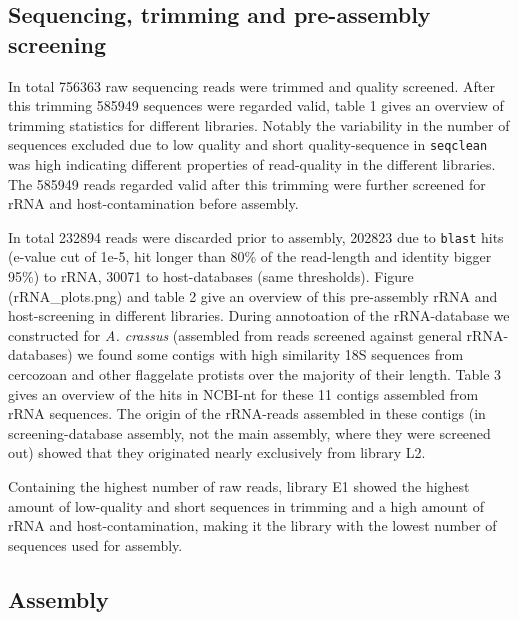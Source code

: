 \documentclass[10pt]{bmc_article}
\newenvironment{bmcformat}{\begin{raggedright}\baselineskip20pt\sloppy\setboolean{publ}{false}}{\end{raggedright}\baselineskip20pt\sloppy}
\begin{document}
\begin{bmcformat}
 \subsection*{Sequencing, trimming and pre-assembly screening}


In total 756363 raw sequencing reads were
trimmed and quality screened. After this trimming
585949 sequences were regarded valid, table 1
gives an overview of trimming statistics for different
libraries. Notably the variability in the number of sequences excluded
due to low quality and short quality-sequence in \texttt{seqclean} was
high indicating different properties of read-quality in the different
libraries. The 585949 reads regarded valid
after this trimming were further screened for rRNA and
host-contamination before assembly.





In total 232894 reads were discarded prior to assembly,
202823 due to \texttt{blast} hits (e-value cut of 1e-5,
hit longer than 80\% of the read-length and identity bigger 95\%) to
rRNA, 30071 to host-databases (same thresholds). Figure
(rRNA\_plots.png) and table 2 give an overview of this pre-assembly
rRNA and host-screening in different libraries. During annotoation of
the rRNA-database we constructed for \textit{A. crassus} (assembled
from reads screened against general rRNA-databases) we found some
contigs with high similarity 18S sequences from cercozoan and other
flaggelate protists over the majority of their length. Table 3 gives
an overview of the hits in NCBI-nt for these 11 contigs assembled from
rRNA sequences. The origin of the rRNA-reads assembled in these
contigs (in screening-database assembly, not the main assembly, where
they were screened out) showed that they originated nearly exclusively
from library L2.
 
Containing the highest number of raw reads, library E1 showed the
highest amount of low-quality and short sequences in trimming and a
high amount of rRNA and host-contamination, making it the library with
the lowest number of sequences used for assembly.

\subsection*{Assembly}



\end{bmcformat}
\end{document}
